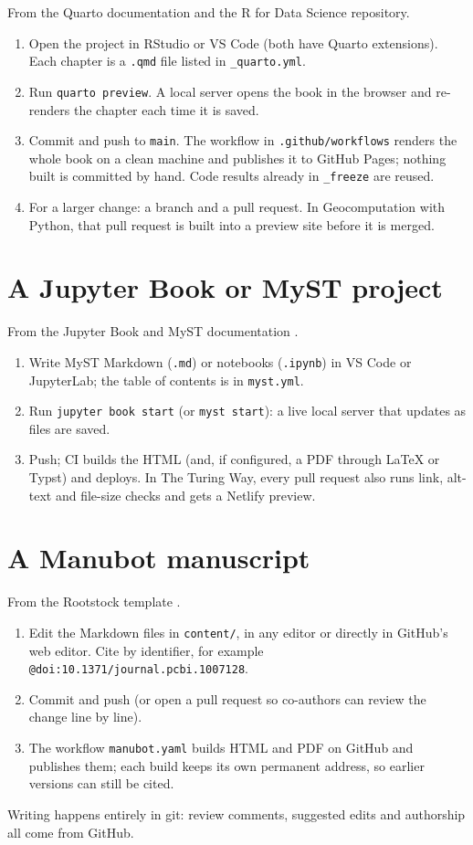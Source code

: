 From the Quarto documentation \citep{quartopub} and the R for Data Science repository.
\begin{enumerate}
\item Open the project in RStudio or VS Code (both have Quarto extensions). Each chapter is a \texttt{.qmd} file listed in \texttt{\_quarto.yml}.
\item Run \texttt{quarto preview}. A local server opens the book in the browser and re-renders the chapter each time it is saved.
\item Commit and push to \texttt{main}. The workflow in \texttt{.github/workflows} renders the whole book on a clean machine and publishes it to GitHub Pages; nothing built is committed by hand. Code results already in \texttt{\_freeze} are reused.
\item For a larger change: a branch and a pull request. In Geocomputation with Python, that pull request is built into a preview site before it is merged.
\end{enumerate}

\section{A Jupyter Book or MyST project}

From the Jupyter Book and MyST documentation \citep{mystpdf}.
\begin{enumerate}
\item Write MyST Markdown (\texttt{.md}) or notebooks (\texttt{.ipynb}) in VS Code or JupyterLab; the table of contents is in \texttt{myst.yml}.
\item Run \texttt{jupyter book start} (or \texttt{myst start}): a live local server that updates as files are saved.
\item Push; CI builds the HTML (and, if configured, a PDF through LaTeX or Typst) and deploys. In The Turing Way, every pull request also runs link, alt-text and file-size checks and gets a Netlify preview.
\end{enumerate}

\section{A Manubot manuscript}

From the Rootstock template \citep{himmelstein2019}.
\begin{enumerate}
\item Edit the Markdown files in \texttt{content/}, in any editor or directly in GitHub's web editor. Cite by identifier, for example \texttt{@doi:10.1371/journal.pcbi.1007128}.
\item Commit and push (or open a pull request so co-authors can review the change line by line).
\item The workflow \texttt{manubot.yaml} builds HTML and PDF on GitHub and publishes them; each build keeps its own permanent address, so earlier versions can still be cited.
\end{enumerate}
Writing happens entirely in git: review comments, suggested edits and authorship all come from GitHub.

